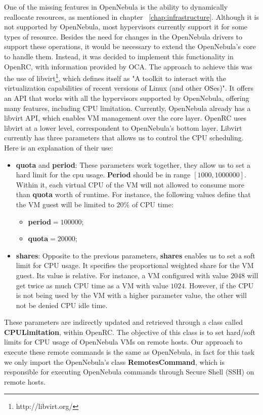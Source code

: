One of the missing features in OpenNebula is the ability to dynamically reallocate resources, as mentioned in chapter ~\ref{chap:infrastructure}. Although it is not supported by OpenNebula, most hypervisors currently support it for some types of resource. Besides the need for changes in the OpenNebula drivers to support these operations, it would be necessary to extend the OpenNebula's core to handle them. Instead, it was decided to implement this functionality in OpenRC, with information provided by OCA. The approach to achieve this  was the use of libvirt\footnote{http://libvirt.org/}, which defines itself as "A toolkit to interact with the virtualization capabilities of recent versions of Linux (and other OSes)". It offers an API that works with all the hypervisors supported by OpenNebula, offering many features, including CPU limitation. Currently, OpenNebula already has a libvirt API, which enables VM management over the core layer. OpenRC uses libvirt at a lower level, correspondent to OpenNebula's 
bottom layer. Libvirt currently has three parameters that allows us to control the CPU scheduling. Here is an explanation of their use:
\begin{itemize}
 \item \textbf{quota} and \textbf{period}: These parameters work together, they allow us to set a hard limit for the cpu usage. \textbf{Period} should be in range $[1000, 1000000]$. Within it, each virtual CPU of the VM will not allowed to consume more than \textbf{quota} worth of runtime. For instance, the following values define that the VM guest will be limited to $20\%$ of CPU time:
  \begin{itemize}
   \item  \textbf{period}$=100000$; 
   \item \textbf{quota}$=20000$;
  \end{itemize}
  \item \textbf{shares}: Opposite to the previous parameters, \textbf{shares} enables us to set a soft limit for CPU usage. It specifies the proportional weighted share for the VM guest. Its value is relative. For instance, a VM configured with value $2048$ will get twice as much CPU time as a VM with value $1024$. However, if the CPU is not being used by the VM with a higher parameter value, the other will not be denied CPU idle time.
\end{itemize}

These parameters are indirectly updated and retrieved through a class called \textbf{CPULimitation}, within OpenRC. The objective of this class is to set hard/soft limits for CPU usage of OpenNebula VMs on remote hosts. Our approach to execute these remote commands  is the same as OpenNebula, in fact for this task we only import the OpenNebula's class \textbf{RemotesCommand}, which is responsible for executing OpenNebula commands through Secure Shell (SSH) on remote hosts.

